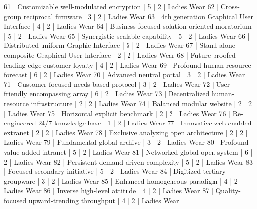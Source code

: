 \begin{enumerate}
\begin{pseudo*}
      61 | Customizable well-modulated encryption           |        5 |      2 | Ladies Wear   
      62 | Cross-group reciprocal firmware                  |        3 |      2 | Ladies Wear   
      63 | 4th generation Graphical User Interface          |        4 |      2 | Ladies Wear   
      64 | Business-focused solution-oriented moratorium    |        5 |      2 | Ladies Wear   
      65 | Synergistic scalable capability                  |        5 |      2 | Ladies Wear   
      66 | Distributed uniform Graphic Interface            |        5 |      2 | Ladies Wear   
      67 | Stand-alone composite Graphical User Interface   |        2 |      2 | Ladies Wear   
      68 | Future-proofed leading edge customer loyalty     |        4 |      2 | Ladies Wear   
      69 | Profound human-resource forecast                 |        6 |      2 | Ladies Wear   
      70 | Advanced neutral portal                          |        3 |      2 | Ladies Wear   
      71 | Customer-focused needs-based protocol            |        3 |      2 | Ladies Wear   
      72 | User-friendly encompassing array                 |        6 |      2 | Ladies Wear   
      73 | Decentralized human-resource infrastructure      |        2 |      2 | Ladies Wear   
      74 | Balanced modular website                         |        2 |      2 | Ladies Wear   
      75 | Horizontal explicit benchmark                    |        2 |      2 | Ladies Wear   
      76 | Re-engineered 24/7 knowledge base                |        1 |      2 | Ladies Wear   
      77 | Innovative web-enabled extranet                  |        2 |      2 | Ladies Wear   
      78 | Exclusive analyzing open architecture            |        2 |      2 | Ladies Wear   
      79 | Fundamental global archive                       |        3 |      2 | Ladies Wear   
      80 | Profound value-added intranet                    |        5 |      2 | Ladies Wear   
      81 | Networked global open system                     |        6 |      2 | Ladies Wear   
      82 | Persistent demand-driven complexity              |        5 |      2 | Ladies Wear   
      83 | Focused secondary initiative                     |        5 |      2 | Ladies Wear   
      84 | Digitized tertiary groupware                     |        3 |      2 | Ladies Wear   
      85 | Enhanced homogeneous paradigm                    |        4 |      2 | Ladies Wear   
      86 | Inverse high-level attitude                      |        4 |      2 | Ladies Wear   
      87 | Quality-focused upward-trending throughput       |        4 |      2 | Ladies Wear   

\end{pseudo*}
\end{enumerate}
